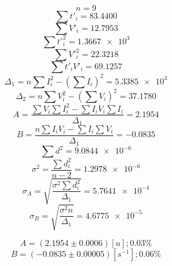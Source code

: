 \documentclass[letter,11pt]{article}
\begin{document}
\begin{equation*}
    n = 9
\end{equation*}
\begin{equation*}
    \sum t'_i = 83.4400
\end{equation*}
\begin{equation*}
    \sum V'_i = 12.7953
\end{equation*}
\begin{equation*}
    \sum t'^2_i = \num{1.3667e3}
\end{equation*}
\begin{equation*}
    \sum V'^2_i = 22.3218
\end{equation*}
\begin{equation*}
    \sum t'_i V'_i = 69.1257
\end{equation*}
\begin{equation*}
    \Delta_1 = n \sum I^2_i - \left( \sum I_i \right)^2 = \num{5.3385e3}
\end{equation*}
\begin{equation*}
    \Delta_2 = n \sum V^2_i - \left( \sum V_i \right)^2 = 37.1780
\end{equation*}
\begin{equation*}
    A = \frac{\sum V_i \sum I^2_i - \sum I_i V_i \sum I_i}{\Delta_1} = 2.1954
\end{equation*}
\begin{equation*}
    B = \frac{n \sum I_i V_i - \sum I_i \sum V_i}{\Delta_1} = -0.0835
\end{equation*}
\begin{equation*}
    \sum d^2 = \num{9.0844e-6}
\end{equation*}
\begin{equation*}
    \sigma^2 = \frac{\sum d^2_i}{n-2} = \num{1.2978e-6}
\end{equation*}
\begin{equation*}
    \sigma_A = \sqrt{\frac{\sigma^2 \sum d^2_i}{\Delta_1}} = \num{5.7641e-4}
\end{equation*}
\begin{equation*}
    \sigma_B = \sqrt{\frac{\sigma^2 n}{\Delta_1}} = \num{4.6775e-5}
\end{equation*}

\begin{equation*}
    A = (2.1954 \pm 0.0006)[u]; 0.03 \%
\end{equation*}
\begin{equation*}
    B = (-0.0835 \pm 0.00005)[s^{-1}]; 0.06 \%
\end{equation*}
\end{document}
